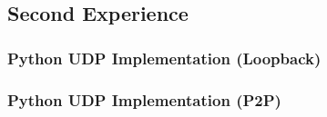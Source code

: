 \subsection{Second Experience}

\subsubsection{Python UDP Implementation (Loopback)}

\subsubsection{Python UDP Implementation (P2P)}